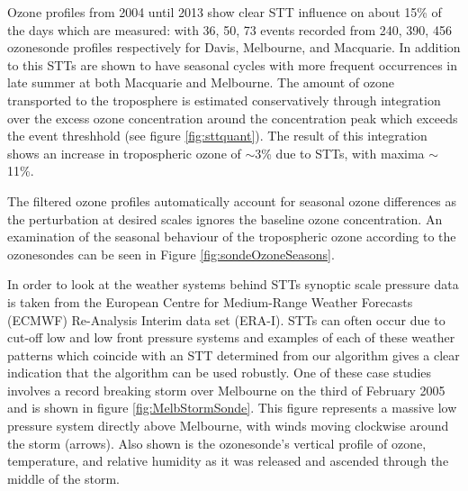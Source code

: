 Ozone profiles from 2004 until 2013 show clear STT influence on about 15\% of the days which are measured: with 36, 50, 73 events recorded from 240, 390, 456 ozonesonde profiles respectively for Davis, Melbourne, and Macquarie.
In addition to this STTs are shown to have seasonal cycles with more frequent occurrences in late summer at both Macquarie and Melbourne.
The amount of ozone transported to the troposphere is estimated conservatively through integration over the excess ozone concentration around the concentration peak which exceeds the event threshhold (see figure \ref{fig:sttquant}).
The result of this integration shows an increase in tropospheric ozone of $\sim$3\% due to STTs, with maxima $\sim$11\%.
 
The filtered ozone profiles automatically account for seasonal ozone differences as the perturbation at desired scales ignores the baseline ozone concentration.
An examination of the seasonal behaviour of the tropospheric ozone according to the ozonesondes can be seen in Figure \ref{fig:sondeOzoneSeasons}.

In order to look at the weather systems behind STTs synoptic scale pressure data is taken from the European Centre for Medium-Range Weather Forecasts (ECMWF) Re-Analysis Interim data set (ERA-I).
STTs can often occur due to cut-off low and low front pressure systems and examples of each of these weather patterns which coincide with an STT determined from our algorithm gives a clear indication that the algorithm can be used robustly.
One of these case studies involves a record breaking storm over Melbourne on the third of February 2005 and is shown in figure \ref{fig:MelbStormSonde}.
This figure represents a massive low pressure system directly above Melbourne, with winds moving clockwise around the storm (arrows).
Also shown is the ozonesonde's vertical profile of ozone, temperature, and relative humidity as it was released and ascended through the middle of the storm.
